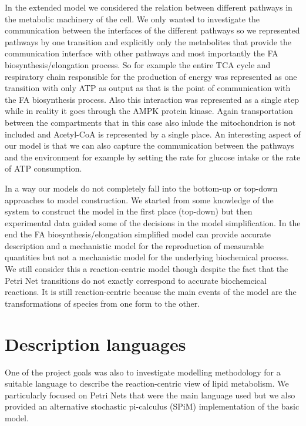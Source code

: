 In the extended model we considered the relation between different
pathways in the metabolic machinery of the cell. We only wanted to
investigate the communication between the interfaces of the different
pathways so we represented pathways by one transition and explicitly
only the metabolites that provide the communication interface with
other pathways and most importantly the FA biosynthesis/elongation
process. So for example the entire TCA cycle and respiratory chain
responsible for the production of energy was represented as one transition with
only ATP as output as that is the point of
communication with the FA biosynthesis process. Also this interaction
was represented as a single step while in reality it goes through the
AMPK protein kinase. Again transportation between the compartments
that in this case also inlude the mitochondrion is not included and
Acetyl-CoA is represented by a single place. An interesting aspect of
our model is that we can also capture the communication between the
pathways and the environment for example by setting the rate for
glucose intake or the rate of ATP consumption.

In a way our models do not completely fall into the bottom-up or
top-down approaches to model construction. We started from some
knowledge of the system to construct the model in the first place
(top-down) but then experimental data guided some of the decisions in
the model simplification. In the end the FA biosynthesis/elongation
simplified model can provide accurate description and a mechanistic model for the reproduction of
measurable quantities but not a mechanistic model for the underlying
biochemical process. We still consider this a reaction-centric model
though despite the fact that the Petri Net transitions do not exactly
correspond to accurate biochemcical reactions. It is still
reaction-centric because the main events of the model are the
transformations of species from one form to the other.

\section{Description languages}
One of the project goals was also to investigate modelling methodology
for a suitable language to describe the reaction-centric view of lipid
metabolism. We particularly focused on Petri Nets that were the main
language used but we also provided an alternative stochastic
pi-calculus (SPiM) implementation of the basic model.

